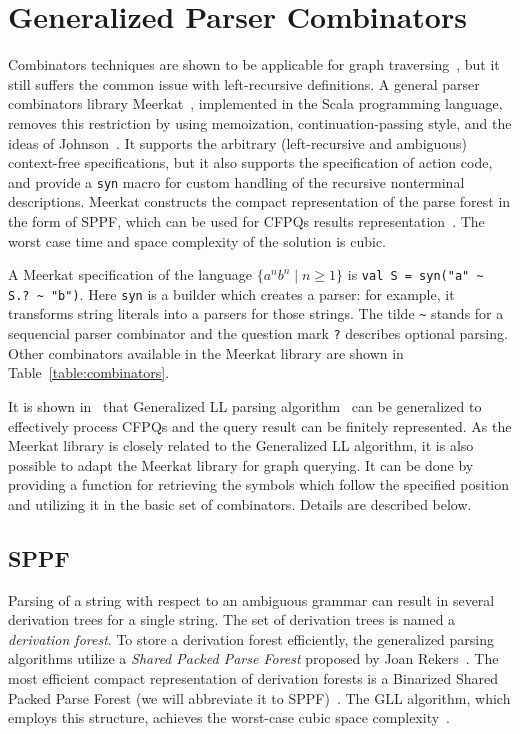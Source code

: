\section{Generalized Parser Combinators}
\label{sec:GLL}

Combinators techniques are shown to be applicable for graph traversing~\cite{ScalaGraphParsing}, but it still suffers the common issue with left-recursive definitions.
A general parser combinators library Meerkat~\cite{Meerkat}, implemented in the Scala programming language, removes this restriction by using memoization, continuation-passing style, and the ideas of Johnson~\cite{Johnson}.
It supports the arbitrary (left-recursive and ambiguous) context-free specifications, but it also supports the specification of action code, and provide a \lstinline{syn} macro for custom handling of the recursive nonterminal descriptions.
Meerkat constructs the compact representation of the parse forest in the form of SPPF, which can be used for CFPQs results representation~\cite{GrigorevR16}.
The worst case time and space complexity of the solution is cubic.

A Meerkat specification of the language $\{a^n b^n \mid n \geq 1\}$ is \lstinline{val S = syn("a" ~ S.? ~ "b")}. Here \lstinline{syn} is a builder which creates a parser: for example, it transforms string literals into a parsers for those strings. The tilde \lstinline{~} stands for a sequencial parser combinator and the question mark \lstinline{?} describes optional parsing. Other combinators available in the Meerkat library are shown in Table~\ref{table:combinators}.

It is shown in~\cite{GrigorevR16} that Generalized LL parsing algorithm~\cite{scott2010gll} can be generalized to effectively process CFPQs and the query result can be finitely represented.
As the Meerkat library is closely related to the Generalized LL algorithm, it is also possible to adapt the Meerkat library for graph querying.
It can be done by providing a function for retrieving the symbols which follow the specified position and utilizing it in the basic set of combinators.
Details are described below.

\subsection{SPPF}

Parsing of a string with respect to an ambiguous grammar can result in several derivation trees for a single string.
The set of derivation trees is named a \emph{derivation forest}.
To store a derivation forest efficiently, the generalized parsing algorithms utilize a \emph{Shared Packed Parse Forest} proposed by Joan Rekers~\cite{SPPF}.
The most efficient compact representation of derivation forests is a Binarized Shared Packed Parse Forest (we will abbreviate it to SPPF)~\cite{brnglr}.
The GLL algorithm, which employs this structure, achieves the worst-case cubic space complexity~\cite{gllParsingTree}.

